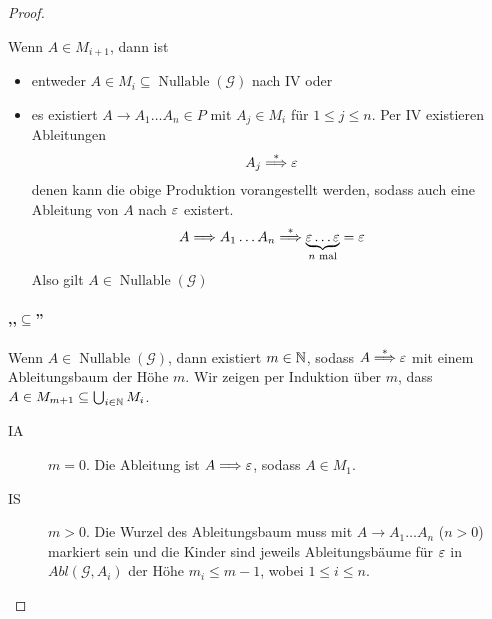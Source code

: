 {\begin{proof}
\begin{description}
    Wenn $A \in M_{i+1}$, dann ist
    \begin{itemize}
    \item entweder
      $A \in M_i \subseteq \operatorname{Nullable}(\mathcal{G})$ nach
      IV oder
    \item 
      es existiert $A \to A_1\ldots A_n \in P$ mit $A_j \in M_i$ für
      $1 \le j \le n$.
      Per IV existieren Ableitungen
      \begin{displaymath}
        A_j \stackrel{*}{\==>} \Eps
      \end{displaymath}
      denen kann die obige Produktion vorangestellt werden, sodass auch
      eine Ableitung von $A$ nach $\varepsilon$ existert.
      \begin{displaymath}
        A  \==> A_1 \ldots A_n \stackrel{*}{\==>} \underbrace{\Eps \ldots \Eps}_{n \text{ mal}} = \Eps
      \end{displaymath}
      Also gilt $A \in \operatorname{Nullable}(\mathcal{G})$
    \end{itemize}
  \end{description}

  
  \paragraph{,,$\subseteq$''}
  Wenn $A \in \operatorname{Nullable}(\mathcal{G})$, dann existiert $m
  \in \mathbb{N}$, sodass $A \stackrel{*}{\==>} \Eps$ mit einem
  Ableitungsbaum der Höhe $m$.
  Wir zeigen per Induktion über $m$, dass $A \in M_{m+1} \subseteq \bigcup_{i \in \mathbb{N}} M_i$.
  \begin{description}
  \item[IA] $m = 0$. Die Ableitung ist $A \==> \Eps$, sodass $A\in M_1$.
  \item[IS] $m > 0$.
    Die Wurzel des Ableitungsbaum muss mit $A \to A_1\ldots A_n$ ($n>0$)
    markiert sein und die Kinder sind jeweils Ableitungsbäume für
    $\varepsilon$ in  $Abl(\mathcal{G}, A_i)$ der Höhe $m_i \le m-1$, wobei $1 \le i \le n$.
    

\end{description}
\end{proof}}
